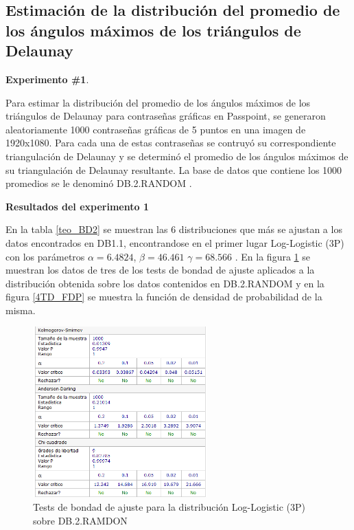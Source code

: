 \documentclass[12pt]{report}
\begin{document}
\subsection{Estimación de la distribución del promedio de los ángulos máximos de los triángulos de Delaunay }
\textbf{Experimento \#1}.

Para estimar la distribución del promedio de los ángulos máximos de los triángulos de Delaunay para contraseñas gráficas en Passpoint, se generaron aleatoriamente 1000 contraseñas gráficas de 5 puntos en una imagen de 1920x1080. Para cada una de estas contraseñas se  contruyó  su correspondiente triangulación  de Delaunay  y se  determinó el promedio  de los ángulos máximos de su triangulación de Delaunay resultante. La base de datos que contiene los 1000 promedios se le denominó DB.2.RANDOM .


\textbf{Resultados del experimento 1}

En la tabla \ref{teo_BD2}  se muestran las 6 distribuciones que más se ajustan a los datos encontrados en DB1.1, encontrandose en el primer lugar Log-Logistic (3P) con los parámetros $\alpha=6.4824$, $\beta=46.461$ $\gamma=68.566$ . En la figura \ref{4TD_BONDAD} se  muestran los datos de tres de los tests de bondad de ajuste aplicados a la distribución obtenida sobre los datos contenidos en DB.2.RANDOM y en la figura \ref{4TD_FDP} se muestra la función de densidad de probabilidad de la misma. 
\begin{figure}[ht]
	\centering
	
	\includegraphics[width=0.6\textwidth]{4td_bondad.png}
	\caption{Tests de bondad de ajuste para la distribución Log-Logistic (3P) sobre DB.2.RAMDON}
	\label{4TD_BONDAD}
\end{figure}
\end{document}
